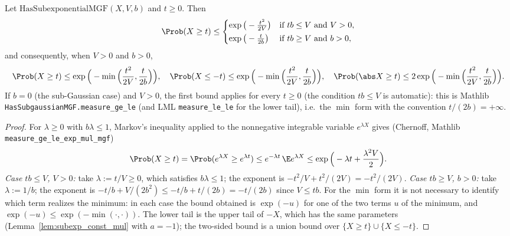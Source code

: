 \begin{lemma}\label{lem:subexp_tail}
\leanok
{}
Let $\mathrm{HasSubexponentialMGF}(X,V,b)$ and $t \ge 0$. Then
\[
  \Prob(X \ge t) \le
  \begin{cases}
    \exp\big(-\frac{t^2}{2V}\big) & \text{if } tb \le V \text{ and } V > 0,\\[2pt]
    \exp\big(-\frac{t}{2b}\big) & \text{if } tb \ge V \text{ and } b > 0 ,
  \end{cases}
\]
and consequently, when $V > 0$ and $b > 0$,
\[
  \Prob(X \ge t) \le \exp\Big(-\min\Big(\frac{t^2}{2V}, \frac{t}{2b}\Big)\Big), \quad
  \Prob(X \le -t) \le \exp\Big(-\min\Big(\frac{t^2}{2V}, \frac{t}{2b}\Big)\Big), \quad
  \Prob(\abs X \ge t) \le 2\exp\Big(-\min\Big(\frac{t^2}{2V}, \frac{t}{2b}\Big)\Big).
\]
If $b = 0$ (the sub-Gaussian case) and $V > 0$, the first bound applies for every $t \ge 0$
(the condition $tb \le V$ is automatic): this is Mathlib
\texttt{HasSubgaussianMGF.measure\_ge\_le} (and LML \texttt{measure\_le\_le} for the lower tail),
i.e.\ the $\min$ form with the convention $t/(2b) = +\infty$.
\end{lemma}

\begin{proof}
\leanok
{}
For $\lambda \ge 0$ with $b\lambda \le 1$, Markov's inequality applied to the nonnegative
integrable variable $e^{\lambda X}$ gives (Chernoff, Mathlib
\texttt{measure\_ge\_le\_exp\_mul\_mgf})
\[
  \Prob(X \ge t) = \Prob(e^{\lambda X} \ge e^{\lambda t}) \le e^{-\lambda t}\,\E e^{\lambda X}
  \le \exp\Big(-\lambda t + \frac{\lambda^2V}{2}\Big).
\]
\emph{Case $tb \le V$, $V > 0$:} take $\lambda := t/V \ge 0$, which satisfies $b\lambda \le 1$;
the exponent is $-t^2/V + t^2/(2V) = -t^2/(2V)$. \emph{Case $tb \ge V$, $b > 0$:} take
$\lambda := 1/b$; the exponent is $-t/b + V/(2b^2) \le -t/b + t/(2b) = -t/(2b)$ since
$V \le tb$. For the $\min$ form it is not necessary to identify which term realizes the
minimum: in each case the bound obtained is $\exp(-u)$ for one of the two terms $u$ of the
minimum, and $\exp(-u) \le \exp(-\min(\cdot,\cdot))$. The lower tail is the upper tail of
$-X$, which has the same parameters (Lemma~\ref{lem:subexp_const_mul} with $a = -1$); the
two-sided bound is a union bound over $\{X \ge t\} \cup \{X \le -t\}$.
\end{proof}

